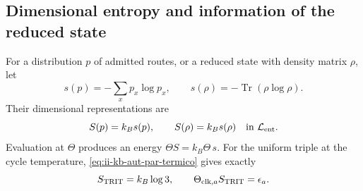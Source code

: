 \subsection{Dimensional entropy and information of the reduced state}

For a distribution \(p\) of admitted routes, or a reduced state
with density matrix \(\rho\), let
\[
 s(p)=-\sum_xp_x\log p_x,\qquad
 s(\rho)=-\operatorname{Tr}(\rho\log\rho).
\]
Their dimensional representations are
\begin{equation}
 S(p)=k_Bs(p),\qquad S(\rho)=k_Bs(\rho)
 \quad\text{in }\mathcal L_{\rm ent}.
 \label{eq:ii-kb-aut-entropia}
\end{equation}
Evaluation at \(\Theta\) produces an energy
\(\Theta S=k_B\Theta\,s\). For the uniform triple at the cycle
temperature, \eqref{eq:ii-kb-aut-par-termico} gives exactly
\[
 S_{\rm TRIT}=k_B\log3,\qquad
 \Theta_{{\rm clk},a}S_{\rm TRIT}=\epsilon_a.
\]
